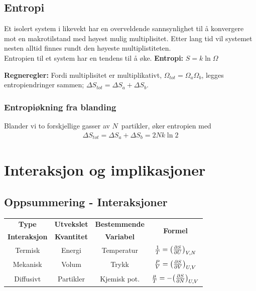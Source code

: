 \documentclass[10pt,a4paper]{article}
\renewcommand{\b}{\textbf}
\begin{document}
\begin{multicols}{2}
\subsection*{Entropi}
\begin{framed}
Et isolert system i likevekt har en overveldende sannsynlighet til å konvergere mot en makrotilstand med høyest mulig multiplisitet. Etter lang tid vil systemet nesten alltid finnes rundt den høyeste multiplistiteten.\\
Entropien til et system har en tendens til å øke.
\b{Entropi:} $S = k\ln{\Omega}$

\b{Regneregler:} Fordi multiplisitet er multiplikativt, $\Omega_{tot} = \Omega_a\Omega_b$, legges entropiendringer sammen; $\Delta S_{tot} = \Delta S_a + \Delta S_b$.

\subsubsection*{Entropiøkning fra blanding}
Blander vi to forskjellige gasser av $N$ partikler, øker entropien med
\begin{align*}
	\Delta S_{tot} = \Delta S_a + \Delta S_b = 2Nk\ln{2}
\end{align*}
\end{framed}




\section{Interaksjon og implikasjoner}
\subsection*{Oppsummering - Interaksjoner}
\resizebox{0.5\textwidth}{!}
{
	\begin{tabular}{||c  c  c  c||}
		\hline
		\b{Type} &  \b{Utvekslet} &  \b{Bestemmende}   & \multirow{2}{1.5cm}{\b{Formel}} \\
		\b{Interaksjon}  &  \b{Kvantitet}  &  \b{Variabel} & \\
		\hline
		Termisk  &  Energi  &  Temperatur  &   $\frac{1}{T} = \qty({\pdv{S}{U}})_{V,N}$ \\
		\hline
		Mekanisk  &  Volum  &  Trykk  &  $\frac{P}{V} = \qty(\pdv{S}{V})_{U,V}$ \\
		\hline
		Diffusivt  &  Partikler  &  Kjemisk pot.  &  $\frac{\mu}{T} = - \qty(\pdv{S}{N})_{U,V}$\\
		\hline
	\end{tabular}
}



\end{multicols}
\end{document}
